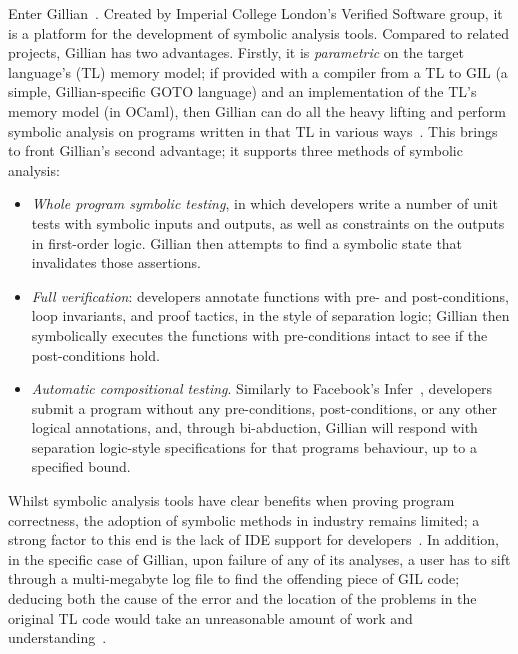 Enter
Gillian~\cite{gillian-santos,gillian-part1,gillian-part2,gillian-techrep}.
Created by Imperial College London's Verified Software group, it
is a platform for the development of symbolic analysis tools. Compared to
related projects, Gillian has two advantages.
Firstly, it is \textit{parametric} on the target language's (TL) memory model;
if provided with a compiler from a TL to GIL (a simple, Gillian-specific
GOTO language) and an implementation of the TL's memory model (in OCaml),
then Gillian can do all the heavy lifting and perform symbolic analysis on programs written in that
TL in various ways~\cite{gillian-part1}. This brings to front Gillian's second advantage; it supports three methods of symbolic
analysis:
\begin{itemize}
  \item \emph{Whole program symbolic testing}, in which developers write a
  number of unit tests with symbolic inputs and outputs, as well as constraints
  on the outputs in first-order logic. Gillian then attempts to find a symbolic
  state that invalidates those assertions.

  \item \emph{Full verification}: developers annotate functions with pre- and
  post-conditions, loop invariants, and proof tactics, in the style of
  separation logic; Gillian then symbolically executes the functions with
  pre-conditions intact to see if the post-conditions hold.

  \item \emph{Automatic compositional testing}. Similarly to Facebook's
  Infer~\cite{infer, infer-site}, developers submit a program without any
  pre-conditions, post-conditions, or any other logical annotations, and,
  through bi-abduction\cite{bi-abduction}, Gillian will respond with
  separation logic-style specifications for that programs behaviour, up
  to a specified bound.
\end{itemize}



Whilst symbolic analysis tools have clear benefits when proving program
correctness, the adoption of symbolic methods in industry remains limited; a
strong factor to this end is the lack of IDE support for
developers~\cite{magpiebridge}.
%
In addition, in the specific case of Gillian, upon failure of any of its analyses, 
a user has to sift through a multi-megabyte log file to
find the offending piece of GIL code; deducing both the cause of the error and
the location of the problems in the original TL code would take an
unreasonable amount of work and understanding~\cite{gillian-debugging-2021}.

